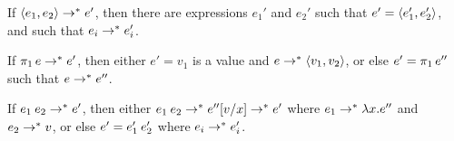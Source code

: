 \begin{lemma}
    \label{lem:subexpression-step}
    \begin{enumlemma}
        \item\label{enum:pair-subexpression-step} If $\langle\textcolor{black}{e_1},\textcolor{black}{e_2}\rangle \to^* e'$, then there are expressions $e_1'$ and $e_2'$ such that $e' = \langle\textcolor{black}{e_1'},\textcolor{black}{e_2'}\rangle$, and such that $e_i \to^* e_i'$.
        
        \item\label{enum:proj-subexpression-step} If $\expProjl{e} \step^* e'$, then either $e' = v_1$ is a value and $e \to^* \langle\textcolor{black}{v_1},\textcolor{black}{v_2}\rangle$, or else $e' = \expProjl{e''}$ such that $e \to^* e''$.

        \item\label{enum:app-subexpression-step} If $\expApp{e_1}{e_2} \step^* e'$, then either $\expApp{e_1}{e_2} \step^* e''[v/x] \step^* e'$ where $e_1 \step^* \expLam{x}{e''}$ and $e_2 \to^* v$, or else $e' = \expApp{e_1'}{e_2'}$ where $e_i \to^* e_i'$.
    \end{enumlemma}
\end{lemma}

